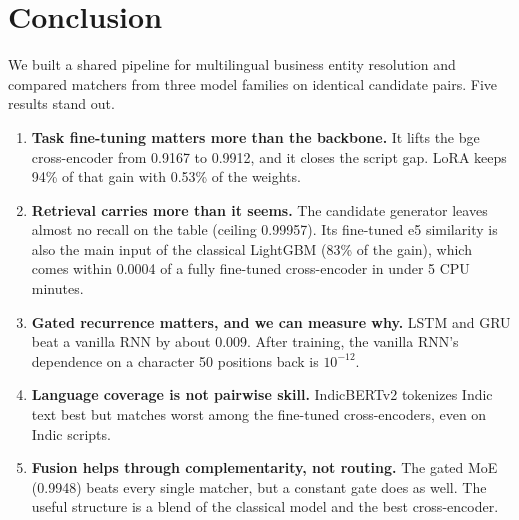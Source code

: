 \section{Conclusion}
\label{sec:conclusion}

We built a shared pipeline for multilingual business entity resolution and compared matchers from three
model families on identical candidate pairs. Five results stand out.
\begin{enumerate}
  \item \textbf{Task fine-tuning matters more than the backbone.} It lifts the bge cross-encoder from 0.9167
        to 0.9912, and it closes the script gap. LoRA keeps 94\% of that gain with 0.53\% of the weights.
  \item \textbf{Retrieval carries more than it seems.} The candidate generator leaves almost no recall on the
        table (ceiling 0.99957). Its fine-tuned e5 similarity is also the main input of the classical
        LightGBM (83\% of the gain), which comes within 0.0004 of a fully fine-tuned cross-encoder in under
        5 CPU minutes.
  \item \textbf{Gated recurrence matters, and we can measure why.} LSTM and GRU beat a vanilla RNN by about
        0.009. After training, the vanilla RNN's dependence on a character 50 positions back is $10^{-12}$.
  \item \textbf{Language coverage is not pairwise skill.} IndicBERTv2 tokenizes Indic text best but matches
        worst among the fine-tuned cross-encoders, even on Indic scripts.
  \item \textbf{Fusion helps through complementarity, not routing.} The gated MoE (0.9948) beats every single
        matcher, but a constant gate does as well. The useful structure is a blend of the classical model
        and the best cross-encoder.
\end{enumerate}
